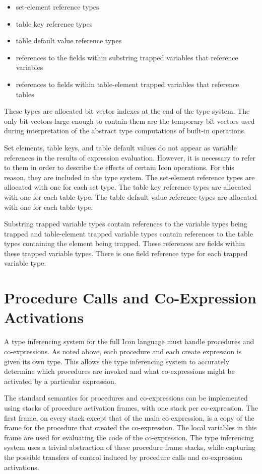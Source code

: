 \liststyleLxxxiii
\begin{itemize}
\item 
set-element reference types 
\item 
table key reference types 
\item 
table default value reference types 
\item 
references to the fields within substring trapped variables that reference variables 
\item 
references to fields within table-element trapped variables that reference tables 
\end{itemize}

These types are allocated bit vector indexes at the end of the type
system. The only bit vectors large enough to contain them are the
temporary bit vectors used during interpretation of the abstract type
computations of built-in operations.

Set elements, table keys, and table default values do not appear as
variable references in the results of expression evaluation. However,
it is necessary to refer to them in order to describe the effects of
certain Icon operations. For this reason, they are included in the
type system. The set-element reference types are allocated with one
for each set type. The table key reference types are allocated with
one for each table type. The table default value reference types are
allocated with one for each table type.

Substring trapped variable types contain references to the variable
types being trapped and table-element trapped variable types contain
references to the table types containing the element being
trapped. These references are fields within these trapped variable
types. There is one field reference type for each trapped variable
type.


\section{Procedure Calls and Co-Expression Activations}

A type inferencing system for the full Icon language must handle
procedures and co-expressions. As noted above, each procedure and each
create expression is given its own type. This allows the type
inferencing system to accurately determine which procedures are
invoked and what co-expressions might be activated by a particular
expression.

The standard semantics for procedures and co-expressions can be
implemented using stacks of procedure activation frames, with one
stack per co-expression. The first frame, on every stack except that
of the main co-expression, is a copy of the frame for the procedure
that created the co-expression. The local variables in this frame are
used for evaluating the code of the co-expression. The type
inferencing system uses a trivial abstraction of these procedure frame
stacks, while capturing the possible transfers of control induced by
procedure calls and co-expression activations.


